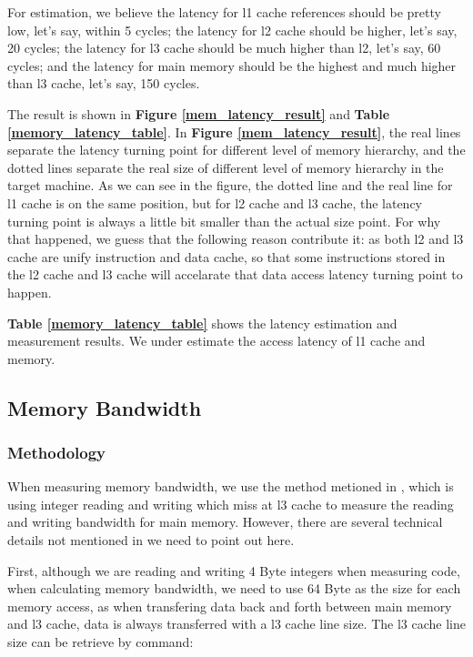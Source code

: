 For estimation, we believe the latency for l1 cache references should be pretty low, let's say, within 5 cycles; the latency for l2 cache should be higher, let's say, 20 cycles; the latency for l3 cache should be much higher than l2, let's say, 60 cycles; and the latency for main memory should be the highest and much higher than l3 cache, let's say, 150 cycles.

The result is shown in \textbf{Figure \ref{mem_latency_result}} and \textbf{Table \ref{memory_latency_table}}. In \textbf{Figure \ref{mem_latency_result}}, the real lines separate the latency turning point for different level of memory hierarchy, and the dotted lines separate the real size of different level of memory hierarchy in the target machine. As we can see in the figure, the dotted line and the real line for l1 cache is on the same position, but for l2 cache and l3 cache, the latency turning point is always a little bit smaller than the actual size point. For why that happened, we guess that the following reason contribute it: as both l2 and l3 cache are unify instruction and data cache, so that some instructions stored in the l2 cache and l3 cache will accelarate that data access latency turning point to happen.

\textbf{Table \ref{memory_latency_table}} shows the latency estimation and measurement results. We under estimate the access latency of l1 cache and memory.

\subsection{Memory Bandwidth}

\subsubsection{Methodology}

When measuring memory bandwidth, we use the method metioned in \cite{mcvoy1996lmbench}, which is using integer reading and writing which miss at l3 cache to measure the reading and writing bandwidth for main memory. However, there are several technical details not mentioned in \cite{mcvoy1996lmbench} we need to point out here.

First, although we are reading and writing 4 Byte integers when measuring code, when calculating memory bandwidth, we need to use 64 Byte as the size for each memory access, as when transfering data back and forth between main memory and l3 cache, data is always transferred with a l3 cache line size. The l3 cache line size can be retrieve by command:

